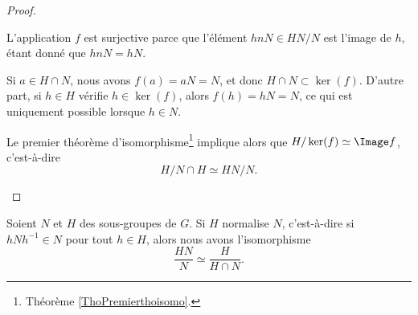\begin{proof}
\begin{enumerate}
		      \begin{subproof}
			      L'application \( f\) est surjective parce que l'élément \( hnN\in HN/N\) est l'image de \( h\), étant donné que \( hnN=hN\).

			      \spitem[\( \ker(f) = H\cap N\)]
			      Si \( a\in H\cap N\), nous avons \( f(a) =aN = N\), et donc \( H\cap N\subset \ker(f)\). D'autre part, si \( h\in H\) vérifie \( h\in\ker(f)\), alors \( f(h)=hN=N\), ce qui est uniquement possible lorsque \( h\in N\).

		      \end{subproof}
		      Le premier théorème d'isomorphisme\footnote{Théorème \ref{ThoPremierthoisomo}.} implique alors que \( H/\ker(f)\simeq \Image f\), c'est-à-dire
		      \begin{equation}
			      H/N\cap H\simeq HN/N.
		      \end{equation}
	\end{enumerate}
\end{proof}

\begin{proposition}     \label{PROPooVBGMooPTlyLF}
	Soient \( N\) et \( H\) des sous-groupes de \( G\). Si \( H\) normalise \( N\), c'est-à-dire si \( hNh^{-1}\in N\) pour tout \( h\in H\), alors nous avons l'isomorphisme
	\begin{equation}
		\frac{ HN }{ N }\simeq\frac{ H }{ H\cap N }.
	\end{equation}
\end{proposition}

